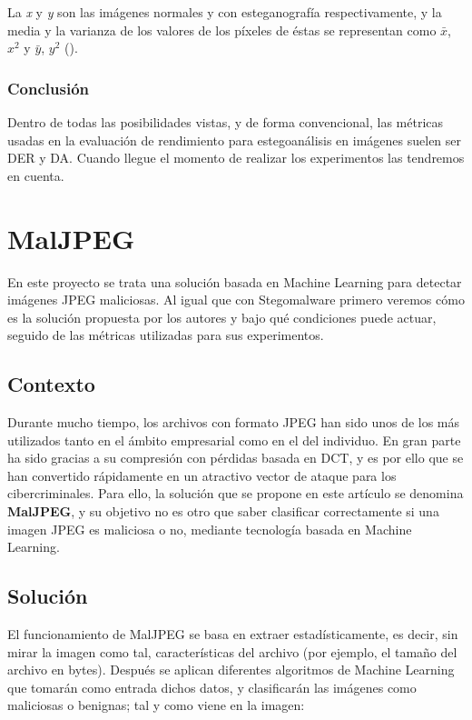La \textit{x} y \textit{y} son las imágenes normales y con esteganografía respectivamente, y la media y la varianza de los valores de los píxeles de éstas se representan como \textit{$\bar{x}$}, \textit{$x^{2}$} y \textit{$\bar{y}$}, \textit{$y^{2}$} (\cite{qi}).%

\subsubsection{Conclusión}

Dentro de todas las posibilidades vistas, y de forma convencional, las métricas usadas en la evaluación de rendimiento para estegoanálisis en imágenes suelen ser \ac{DER} y \ac{DA}. Cuando llegue el momento de realizar los experimentos las tendremos en cuenta.

\section{MalJPEG}

En este proyecto se trata una solución basada en Machine Learning para detectar imágenes JPEG maliciosas. Al igual que con Stegomalware primero veremos cómo es la solución propuesta por los autores y bajo qué condiciones puede actuar, seguido de las métricas utilizadas para sus experimentos.

\subsection{Contexto}

Durante mucho tiempo, los archivos con formato JPEG han sido unos de los más utilizados tanto en el ámbito empresarial como en el del individuo. En gran parte ha sido gracias a su compresión con pérdidas basada en \ac{DCT}, y es por ello que se han convertido rápidamente en un atractivo vector de ataque para los cibercriminales. Para ello, la solución que se propone en este artículo se denomina \textbf{MalJPEG}, y su objetivo no es otro que saber clasificar correctamente si una imagen JPEG es maliciosa o no, mediante tecnología basada en Machine Learning.

\subsection{Solución}

El funcionamiento de MalJPEG se basa en extraer estadísticamente, es decir, sin mirar la imagen como tal, características del archivo (por ejemplo, el tamaño del archivo en bytes). Después se aplican diferentes algoritmos de Machine Learning que tomarán como entrada dichos datos, y clasificarán las imágenes como maliciosas o benignas; tal y como viene en la imagen:

